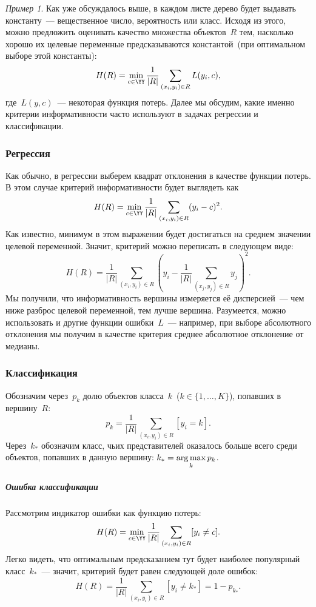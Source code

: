 \documentclass[a4paper, 12pt]{article}
\newcommand{\argmax}{\mathop{\rm arg\,max}\limits}
\theoremstyle{plain} %
\theoremstyle{definition} %
\theoremstyle{remark} %
\newtheorem{example}{Пример}
\begin{document}
\begin{example}
Как уже обсуждалось выше, в каждом листе дерево будет выдавать константу~--- вещественное число, вероятность
или класс.
Исходя из этого, можно предложить оценивать качество множества объектов~$R$ тем,
насколько хорошо их целевые переменные предсказываются константой~(при оптимальном выборе этой константы):
\[
    H(R)
    =
    \min_{c \in \YY}
    \frac{1}{|R|}
    \sum_{(x_i, y_i) \in R}
        L(y_i, c),
\]
где~$L(y, c)$~--- некоторая функция потерь.
Далее мы обсудим, какие именно критерии информативности часто используют в задачах регрессии и классификации.

\subsubsection{Регрессия}
Как обычно, в регрессии выберем квадрат отклонения в качестве функции потерь.
В этом случае критерий информативности будет выглядеть как
\[
    H(R)
    =
    \min_{c \in \YY}
    \frac{1}{|R|}
    \sum_{(x_i, y_i) \in R}
        (y_i - c)^2.
\]
Как известно, минимум в этом выражении будет достигаться на среднем значении целевой переменной.
Значит, критерий можно переписать в следующем виде:
\[
    H(R)
    =
    \frac{1}{|R|}
    \sum_{(x_i, y_i) \in R}
    \left(
        y_i
        -
        \frac{1}{|R|}
        \sum_{(x_j, y_j) \in R}
            y_j
    \right)^2.
\]
Мы получили, что информативность вершины измеряется её дисперсией~---
чем ниже разброс целевой переменной, тем лучше вершина.
Разумеется, можно использовать и другие функции ошибки~$L$~---
например, при выборе абсолютного отклонения мы получим в качестве критерия среднее абсолютное отклонение от медианы.

\subsubsection{Классификация}
Обозначим через~$p_{k}$ долю объектов класса~$k$~($k \in \{1, \dots, K\}$), попавших в вершину~$R$:
\[
    p_{k}
    =
    \frac{1}{|R|}
    \sum_{(x_i, y_i) \in R}
        [y_i = k].
\]
Через~$k_*$ обозначим класс, чьих представителей оказалось больше всего среди объектов,
попавших в данную вершину: $k_* = \argmax_k p_{k}$.

\subparagraph{Ошибка классификации}
Рассмотрим индикатор ошибки как функцию потерь:
\[
    H(R)
    =
    \min_{c \in \YY}
    \frac{1}{|R|}
    \sum_{(x_i, y_i) \in R}
        [y_i \neq c].
\]
Легко видеть, что оптимальным предсказанием тут будет наиболее популярный класс~$k_*$~---
значит, критерий будет равен следующей доле ошибок:
\[
    H(R)
    =
    \frac{1}{|R|}
    \sum_{(x_i, y_i) \in R}
        [y_i \neq k_*]
    =
    1 - p_{k_*}.
\]


\end{example}
\end{document}
